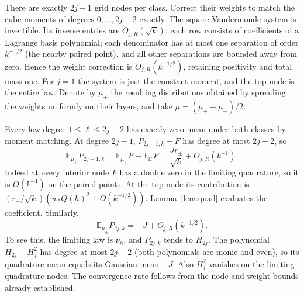\documentclass[11pt]{article}
\theoremstyle{remark}\newtheorem{remark}[theorem]{Remark}
\newcommand{\E}{\mathbb E}
\newcommand{\U}{\mathcal U}
\begin{document}
There are exactly $2j-1$ grid nodes per class. Correct their weights to match the cube moments of degrees $0,\ldots,2j-2$ exactly. The square Vandermonde system is invertible. Its inverse entries are $O_{j,R}(\sqrt{k})$: each row consists of coefficients of a Lagrange basis polynomial; each denominator has at most one separation of order $k^{-1/2}$ (the nearby paired point), and all other separations are bounded away from zero. Hence the weight correction is $O_{j,R}(k^{-1/2})$, retaining positivity and total mass one. For $j=1$ the system is just the constant moment, and the top node is the entire law. Denote by $\mu_\pm$ the resulting distributions obtained by spreading the weights uniformly on their layers, and take $\mu=(\mu_++\mu_-)/2$.

Every low degree $1\le\ell\le 2j-2$ has exactly zero mean under both classes by moment matching. At degree $2j-1$, $P_{2j-1,k}-F$ has degree at most $2j-2$, so
\begin{equation}\label{eq:odd}
 \E_{\mu_\pm} P_{2j-1,k}=\E_{\mu_\pm} F-\E_\U F
 =\frac{Jr_\pm}{\sqrt{k}}+O_{j,R}(k^{-1}).
\end{equation}
Indeed at every interior node $F$ has a double zero in the limiting quadrature, so it is $O(k^{-1})$ on the paired points. At the top node its contribution is $(r_\pm/\sqrt{k})(w_* Q(h)^2+O(k^{-1/2}))$. Lemma~\ref{lem:quad} evaluates the coefficient. Similarly,
\begin{equation}\label{eq:even}
 \E_{\mu_\pm}P_{2j,k}=-J+O_{j,R}(k^{-1/2}).
\end{equation}
To see this, the limiting law is $\nu_h$, and $P_{2j,k}$ tends to $H_{2j}$. The polynomial $H_{2j}-H_j^2$ has degree at most $2j-2$ (both polynomials are monic and even), so its quadrature mean equals its Gaussian mean $-J$. Also $H_j^2$ vanishes on the limiting quadrature nodes. The convergence rate follows from the node and weight bounds already established.
\end{document}
